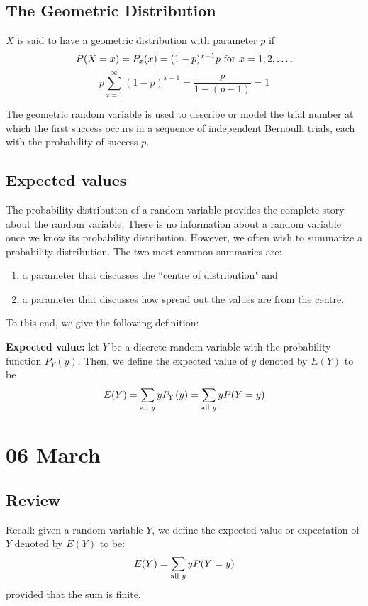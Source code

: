 \documentclass[12pt]{article}
\begin{document}
\subsection{The Geometric Distribution}

$X$ is said to have a geometric distribution with parameter $p$ if 
\[
    P(X = x) = P_x (x) = (1-p)^{x-1} p \textnormal{ for } x = 1, 2, \ldots.
\]
\[
    p \sum_{x = 1}^{\infty} (1-p)^{x-1} = \frac{p}{1-(p-1)} = 1
\]

The geometric random variable is used to describe or model the trial number at which the first success occurs in a sequence of independent Bernoulli trials, each with the probability of success $p$.

\subsection{Expected values}
The probability distribution of a random variable provides the complete story about the random variable. There is no information about a random variable once we know its probability distribution. However, we often wish to summarize a probability distribution. The two most common summaries are:
\begin{enumerate}
    \item a parameter that discusses the ``centre of distribution" and
    \item a parameter that discusses how spread out the values are from the centre.
\end{enumerate}

To this end, we give the following definition:

\textbf{Expected value:} let $Y$ be a discrete random variable with the probability function $P_Y (y)$. Then, we define the expected value of $y$ denoted by $E(Y)$ to be
\[
    E(Y) = \sum_{\textnormal{all } y} y P_Y (y) = \sum_{\textnormal{all } y} y P(Y = y)
\]

\section{06 March}
\subsection{Review}
Recall: given a random variable $Y$, we define the expected value or expectation of $Y$ denoted by $E(Y)$ to be:
\[
    E(Y) = \sum_{\textnormal{all } y} y P(Y = y)
\]
provided that the sum is finite.
\end{document}
